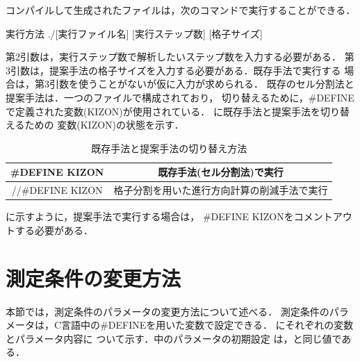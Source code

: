 コンパイルして生成されたファイルは，次のコマンドで実行することができる．
\begin{itembox}[l]{実行方法}
./[実行ファイル名] [実行ステップ数] [格子サイズ]
\end{itembox}
第2引数は，実行ステップ数で解析したいステップ数を入力する必要がある．
第3引数は，提案手法の格子サイズを入力する必要がある．既存手法で実行する
場合は，第3引数を使うことがないが仮に入力が求められる．
既存のセル分割法と提案手法は．一つのファイルで構成されており，
切り替えるために，\#DEFINEで定義された変数(KIZON)が使用されている．
に既存手法と提案手法を切り替えるための
変数(KIZON)の状態を示す．
%
\begin{table}[H]
  \begin{center}
    \caption{既存手法と提案手法の切り替え方法}
    \label{tb:toggle_kizon}
    \begin{tabular}{c|c}
      \hline \hline
      \#DEFINE KIZON     & 既存手法(セル分割法)で実行 \\ \hline
      //\#DEFINE KIZON & 格子分割を用いた進行方向計算の削減手法で実行\\ \hline
    \end{tabular}
  \end{center}
\end{table}
%
に示すように，提案手法で実行する場合は，
\#DEFINE KIZONをコメントアウトする必要がある．

\section{測定条件の変更方法}
本節では，測定条件のパラメータの変更方法について述べる．
測定条件のパラメータは，C言語中の\#DEFINEを用いた変数で設定できる．
にそれぞれの変数とパラメータ内容に
ついて示す．中のパラメータの初期設定
は，と同じ値である．


